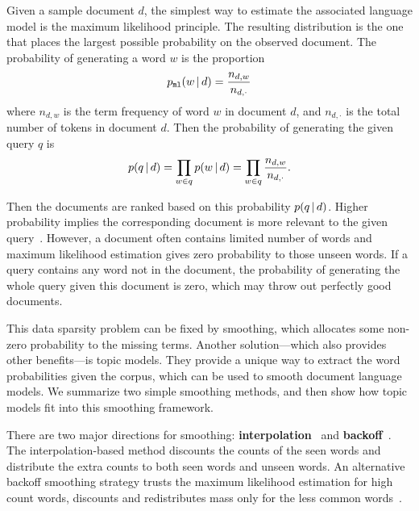 Given a sample document $d$, the simplest way to estimate the
associated language model is the maximum likelihood principle. 
The resulting distribution is the one that places the largest possible probability on the observed document.
The probability of generating a word $w$ is the proportion
\begin{align}
p_{\texttt{ml}}(w \, | \, d) = \frac{n_{d,w}}{n_{d,\cdot}}
\label{eq:ir_mse}
\end{align}
where $n_{d,w}$ is the term frequency of word $w$ in document $d$, and
$n_{d,\cdot}$ is the total number of tokens in document $d$. Then the
probability of generating the given query $q$ is
\begin{align}
p(q \, | \, d) = \prod_{w \in q} p(w \, | \, d) = \prod_{w \in q} \frac{n_{d,w}}{n_{d,\cdot}}.
\end{align}

Then the documents are ranked based on this probability $p(q \, | \, d)$. Higher
probability implies the corresponding document is more relevant to the
given query~\citep{song-99}. However, a document often contains limited number of words and
maximum likelihood estimation gives zero probability to those unseen words.
If a query contains any word not in the document, the probability
of generating the whole query given this document is zero, which may throw out perfectly good documents.

This data sparsity problem can be fixed by smoothing, which allocates
some non-zero probability to the missing terms.  Another
solution---which also provides other benefits---is topic models.  They
provide a unique way to extract the word probabilities given the
corpus, which can be used to smooth document language models.  We
summarize two simple smoothing methods, and then show how topic models
fit into this smoothing framework.


There are two major directions for smoothing:
\textbf{interpolation}~\citep{Jelinek-1980,mackay95dirichlet,Ney-1994,PonteCroft,zhai-01}
and \textbf{backoff}~\citep{katz-87,song-99}. The interpolation-based
method discounts the counts of the seen words and distribute the extra
counts to both seen words and unseen words. An alternative backoff
smoothing strategy trusts the maximum likelihood estimation for high
count words, discounts and redistributes mass only for the less common
words~\citep{zhai-01}.

